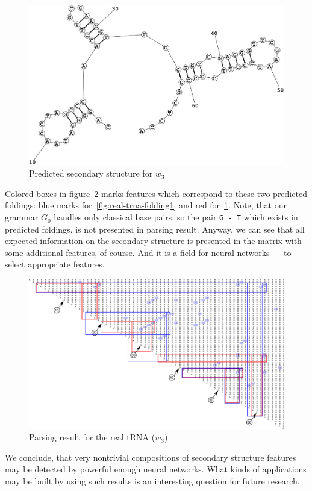 \documentclass[a4paper,twoside]{article}
\begin{document}
\begin{figure}
\centering
\includegraphics[width=.45\textwidth]{figures/Fold2.pdf}
\caption{Predicted secondary structure for $w_3$}
\label{fig:real-trna-folding2}
\end{figure}

Colored boxes in figure~\ref{fig:real-trna} marks features which correspond to these two predicted foldings: blue marks for~\ref{fig:real-trna-folding1} and red for~\ref{fig:real-trna-folding2}.
Note, that our grammar $G_0$ handles only classical base pairs, so the pair \verb|G - T| which exists in predicted foldings, is not presented in parsing result.
Anyway, we can see that all expected information on the secondary structure is presented in the matrix with some additional features, of course.
And it is a field for neural networks --- to select appropriate features.

\begin{figure}
\centering
\includegraphics[width=.98\textwidth]{figures/0m.pdf}
\caption{Parsing result for the real tRNA ($w_3$)}
\label{fig:real-trna}
\end{figure}

We conclude, that very nontrivial compositions of secondary structure features may be detected by powerful enough neural networks.
What kinds of applications may be built by using such results is an interesting question for future research.
\end{document}

